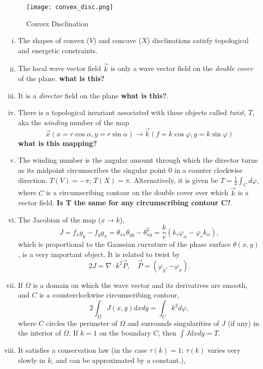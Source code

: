 \documentclass[12pt]{article}
\begin{document}
     \begin{figure}[ht]
        \centering
        \texttt{[image: convex\_disc.png]}
        \caption{Convex Disclination}
        \label{fig:3}
    \end{figure}

\begin{enumerate}[(i)]
    \item The shapes of convex ($V$) and concave ($X$) disclinations satisfy topological and energetic constraints.
    \item The local wave vector field $\vec{k}$ is only a wave vector field on the \emph{double cover} of the plane. \textbf{what is this?}
    \item It is a \emph{director} field on the plane \textbf{what is this?}.
    \item There is a topological invariant associated with these objects called \emph{twist}, $T$, aka the \emph{winding} number of the map
        \[
            \vec{x}(x=r\cos\alpha,y=r\sin\alpha)\rightarrow \vec{k}(f=k\cos{\varphi},g=k\sin\varphi)
        \]
    \textbf{what is this mapping?}
\item The winding number is the angular amount through which the director turns as its midpoint circumscribes the singular point $0$ in a counter clockwise direction. $T(V)=-\pi$; $T(X)=\pi$. Alternatively, it is given be $T = \frac{1}{2}\int_C d\varphi$, where $C$ is a circumscribing contour on the double cover over which $\vec{k}$ is a vector field. \textbf{Is T the same for any circumscribing contour C?}.
\item The Jacobian of the map ($x \rightarrow k$),
    \[
        J = f_xg_y-f_yg_x=\theta_{xx}\theta_{yy}-\theta_{xy}^2 = \frac{k}{r}(k_r\varphi_{\alpha}-\varphi_{r}k_{\alpha}),
    \] 
    which is proportional to the Gaussian curvature of the phase surface $\theta(x,y)$, is a very important object. It is related to twist by
    \[
        2J = \nabla \cdot k^2\vec{P}, \quad \vec{P} = (\varphi_y, -\varphi_x).
    \] 
\item If $\Omega$ is a domain on which the wave vector and its derivatives are smooth, and $C$ is a counterclockwise circumscribing contour,
    \[
        2\int_{\Omega}J(x,y)dxdy = \int_{C}k^2d\varphi,
    \] 
    where $C$ circles the perimeter of $\Omega$ and surrounds singularities of $J$ (if any) in the interior of $\Omega$. If $k=1$ on the boundary $C$, then $\int Jdxdy = T$.
\item It satisfies a conservation law (in the case $\tau(k)=1$; $\tau(k)$ varies very slowly in $k$, and can be approximated by a constant.),

\end{enumerate}
\end{document}
